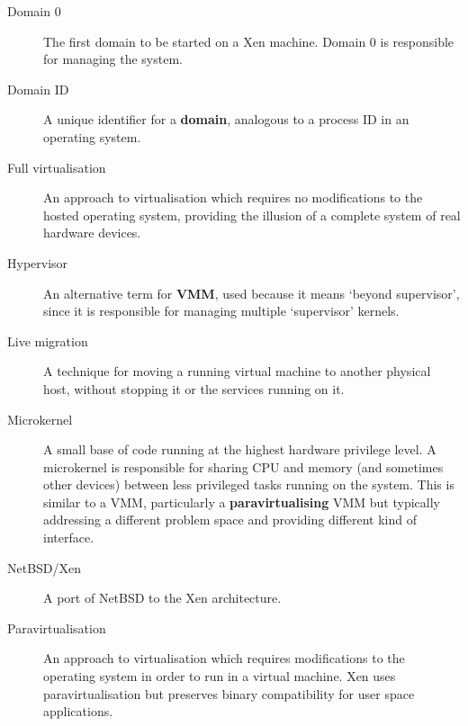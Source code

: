 \documentclass[11pt,twoside,final,openright]{report}
\begin{document}
{\begin{description}
\item[Domain 0]            The first domain to be started on a Xen
                           machine.  Domain 0 is responsible for managing
                           the system.

\item[Domain ID]           A unique identifier for a {\bf domain},
                           analogous to a process ID in an operating
                           system.

\item[Full virtualisation] An approach to virtualisation which
                           requires no modifications to the hosted
                           operating system, providing the illusion of
                           a complete system of real hardware devices.

\item[Hypervisor]          An alternative term for {\bf VMM}, used
                           because it means `beyond supervisor',
                           since it is responsible for managing multiple
                           `supervisor' kernels.

\item[Live migration]      A technique for moving a running virtual
                           machine to another physical host, without
                           stopping it or the services running on it.

\item[Microkernel]         A small base of code running at the highest
                           hardware privilege level.  A microkernel is
                           responsible for sharing CPU and memory (and
                           sometimes other devices) between less
                           privileged tasks running on the system.
                           This is similar to a VMM, particularly a
                           {\bf paravirtualising} VMM but typically
                           addressing a different problem space and
                           providing different kind of interface.

\item[NetBSD/Xen]          A port of NetBSD to the Xen architecture.

\item[Paravirtualisation]  An approach to virtualisation which requires
                           modifications to the operating system in
                           order to run in a virtual machine.  Xen
                           uses paravirtualisation but preserves
                           binary compatibility for user space
                           applications.


\end{description}}
\end{document}
